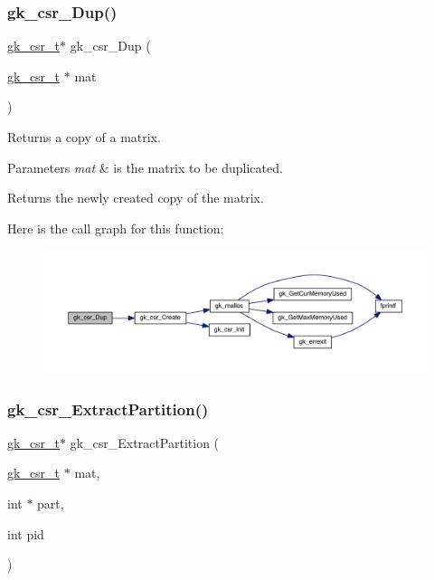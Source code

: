 \subsubsection{\texorpdfstring{gk\+\_\+csr\+\_\+\+Dup()}{gk\_csr\_Dup()}}
{\footnotesize\ttfamily \hyperlink{a00634}{gk\+\_\+csr\+\_\+t}$\ast$ gk\+\_\+csr\+\_\+\+Dup (\begin{DoxyParamCaption}\item[{\hyperlink{a00634}{gk\+\_\+csr\+\_\+t} $\ast$}]{mat }\end{DoxyParamCaption})}

Returns a copy of a matrix. 
\begin{DoxyParams}{Parameters}
{\em mat} & is the matrix to be duplicated. \\
\hline
\end{DoxyParams}
\begin{DoxyReturn}{Returns}
the newly created copy of the matrix. 
\end{DoxyReturn}
Here is the call graph for this function\+:\nopagebreak
\begin{figure}[H]
\begin{center}
\leavevmode
\includegraphics[width=350pt]{a00023_a24144cf4c30d5ec4ed8b488d371476b3_cgraph}
\end{center}
\end{figure}
\mbox{\label{a00023_ac59047c4a89fa4680d746fcdce4aa1a7}} 
\subsubsection{\texorpdfstring{gk\+\_\+csr\+\_\+\+Extract\+Partition()}{gk\_csr\_ExtractPartition()}}
{\footnotesize\ttfamily \hyperlink{a00634}{gk\+\_\+csr\+\_\+t}$\ast$ gk\+\_\+csr\+\_\+\+Extract\+Partition (\begin{DoxyParamCaption}\item[{\hyperlink{a00634}{gk\+\_\+csr\+\_\+t} $\ast$}]{mat,  }\item[{int $\ast$}]{part,  }\item[{int}]{pid }\end{DoxyParamCaption})}

